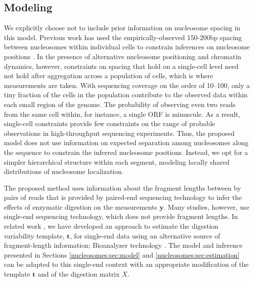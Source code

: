 \subsection{Modeling}
\label{nucleosomes:sec:remarksModeling}


We explicitly choose not to include prior information on nucleosome spacing in this model.
Previous work has used the empirically-observed 150-200bp spacing between nucleosomes within individual cells to constrain inferences on nucleosome positions \citep[e.g., see][]{Shivaswamy2008,Yuan2005}.
In the presence of alternative nucleosome positioning and chromatin dynamics, however, constraints on spacing that hold on a single-cell level need not hold after aggregation across a population of cells, which is where measurements are taken.
%
With sequencing coverage on the order of 10--100, only a tiny fraction of the cells in the population contribute to the observed data within each small region of the genome.
The probability of observing even two reads from the same cell within, for instance, a single ORF is minuscule.
As a result, single-cell constraints provide few constraints on the range of probable observations in high-throughput sequencing experiments.
%
Thus, the proposed model does not use information on expected separation among nucleosomes along the sequence to constrain the inferred nucleosome positions.
Instead, we opt for a simpler hierarchical structure within each segment, modeling locally shared distributions of nucleosome localization.


The proposed method uses information about the fragment lengths between by pairs of reads that is provided by paired-end sequencing technology to infer the effects of enzymatic digestion on the measurements $\bm{y}$.
Many studies, however, use single-end sequencing technology, which does not provide fragment lengths.
In related work \citep{Xu:Alex:Edo:Erin:2011}, we have developed an approach to estimate the digestion variability template, $\bm t$, for single-end data using an alternative source of fragment-length information; Bioanalyzer technology \citep[e.g.,][]{Mueller2000}.
The model and inference presented in Sections \ref{nucleosomes:sec:model} and \ref{nucleosomes:sec:estimation} can be adapted to this single-end context with an appropriate modification of the template $\bm t$ and of the digestion matrix $X$.

